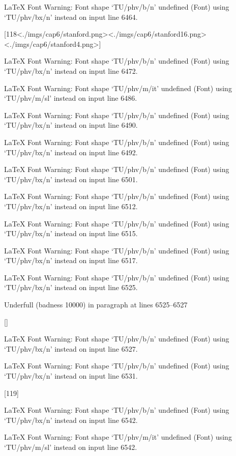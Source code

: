 LaTeX Font Warning: Font shape `TU/phv/b/n' undefined
(Font)              using `TU/phv/bx/n' instead on input line 6464.

[118<./imgs/cap6/stanford.png><./imgs/cap6/stanford16.png><./imgs/cap6/stanford4.png>]

LaTeX Font Warning: Font shape `TU/phv/b/n' undefined
(Font)              using `TU/phv/bx/n' instead on input line 6472.


LaTeX Font Warning: Font shape `TU/phv/m/it' undefined
(Font)              using `TU/phv/m/sl' instead on input line 6486.


LaTeX Font Warning: Font shape `TU/phv/b/n' undefined
(Font)              using `TU/phv/bx/n' instead on input line 6490.


LaTeX Font Warning: Font shape `TU/phv/b/n' undefined
(Font)              using `TU/phv/bx/n' instead on input line 6492.


LaTeX Font Warning: Font shape `TU/phv/b/n' undefined
(Font)              using `TU/phv/bx/n' instead on input line 6501.


LaTeX Font Warning: Font shape `TU/phv/b/n' undefined
(Font)              using `TU/phv/bx/n' instead on input line 6512.


LaTeX Font Warning: Font shape `TU/phv/b/n' undefined
(Font)              using `TU/phv/bx/n' instead on input line 6515.


LaTeX Font Warning: Font shape `TU/phv/b/n' undefined
(Font)              using `TU/phv/bx/n' instead on input line 6517.


LaTeX Font Warning: Font shape `TU/phv/b/n' undefined
(Font)              using `TU/phv/bx/n' instead on input line 6525.


Underfull \hbox (badness 10000) in paragraph at lines 6525--6527

 []


LaTeX Font Warning: Font shape `TU/phv/b/n' undefined
(Font)              using `TU/phv/bx/n' instead on input line 6527.


LaTeX Font Warning: Font shape `TU/phv/b/n' undefined
(Font)              using `TU/phv/bx/n' instead on input line 6531.

[119]

LaTeX Font Warning: Font shape `TU/phv/b/n' undefined
(Font)              using `TU/phv/bx/n' instead on input line 6542.


LaTeX Font Warning: Font shape `TU/phv/m/it' undefined
(Font)              using `TU/phv/m/sl' instead on input line 6542.


